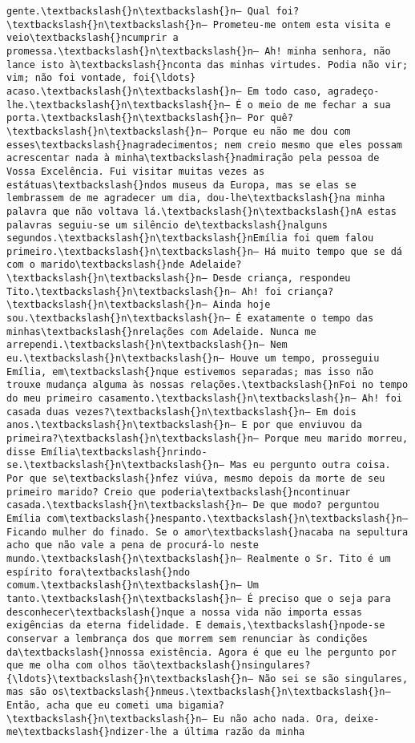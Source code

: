 \documentclass[11pt]{article}
\begin{document}
\begin{Verbatim}[commandchars=\\\{\}]
gente.\textbackslash{}n\textbackslash{}n— Qual foi?\textbackslash{}n\textbackslash{}n— Prometeu-me ontem esta visita e veio\textbackslash{}ncumprir a promessa.\textbackslash{}n\textbackslash{}n— Ah! minha senhora, não lance isto à\textbackslash{}nconta das minhas virtudes. Podia não vir; vim; não foi vontade, foi{\ldots} acaso.\textbackslash{}n\textbackslash{}n— Em todo caso, agradeço-lhe.\textbackslash{}n\textbackslash{}n— É o meio de me fechar a sua porta.\textbackslash{}n\textbackslash{}n— Por quê?\textbackslash{}n\textbackslash{}n— Porque eu não me dou com esses\textbackslash{}nagradecimentos; nem creio mesmo que eles possam acrescentar nada à minha\textbackslash{}nadmiração pela pessoa de Vossa Excelência. Fui visitar muitas vezes as estátuas\textbackslash{}ndos museus da Europa, mas se elas se lembrassem de me agradecer um dia, dou-lhe\textbackslash{}na minha palavra que não voltava lá.\textbackslash{}n\textbackslash{}nA estas palavras seguiu-se um silêncio de\textbackslash{}nalguns segundos.\textbackslash{}n\textbackslash{}nEmília foi quem falou primeiro.\textbackslash{}n\textbackslash{}n— Há muito tempo que se dá com o marido\textbackslash{}nde Adelaide?\textbackslash{}n\textbackslash{}n— Desde criança, respondeu Tito.\textbackslash{}n\textbackslash{}n— Ah! foi criança?\textbackslash{}n\textbackslash{}n— Ainda hoje sou.\textbackslash{}n\textbackslash{}n— É exatamente o tempo das minhas\textbackslash{}nrelações com Adelaide. Nunca me arrependi.\textbackslash{}n\textbackslash{}n— Nem eu.\textbackslash{}n\textbackslash{}n— Houve um tempo, prosseguiu Emília, em\textbackslash{}nque estivemos separadas; mas isso não trouxe mudança alguma às nossas relações.\textbackslash{}nFoi no tempo do meu primeiro casamento.\textbackslash{}n\textbackslash{}n— Ah! foi casada duas vezes?\textbackslash{}n\textbackslash{}n— Em dois anos.\textbackslash{}n\textbackslash{}n— E por que enviuvou da primeira?\textbackslash{}n\textbackslash{}n— Porque meu marido morreu, disse Emília\textbackslash{}nrindo-se.\textbackslash{}n\textbackslash{}n— Mas eu pergunto outra coisa. Por que se\textbackslash{}nfez viúva, mesmo depois da morte de seu primeiro marido? Creio que poderia\textbackslash{}ncontinuar casada.\textbackslash{}n\textbackslash{}n— De que modo? perguntou Emília com\textbackslash{}nespanto.\textbackslash{}n\textbackslash{}n— Ficando mulher do finado. Se o amor\textbackslash{}nacaba na sepultura acho que não vale a pena de procurá-lo neste mundo.\textbackslash{}n\textbackslash{}n— Realmente o Sr. Tito é um espírito fora\textbackslash{}ndo comum.\textbackslash{}n\textbackslash{}n— Um tanto.\textbackslash{}n\textbackslash{}n— É preciso que o seja para desconhecer\textbackslash{}nque a nossa vida não importa essas exigências da eterna fidelidade. E demais,\textbackslash{}npode-se conservar a lembrança dos que morrem sem renunciar às condições da\textbackslash{}nnossa existência. Agora é que eu lhe pergunto por que me olha com olhos tão\textbackslash{}nsingulares?{\ldots}\textbackslash{}n\textbackslash{}n— Não sei se são singulares, mas são os\textbackslash{}nmeus.\textbackslash{}n\textbackslash{}n— Então, acha que eu cometi uma bigamia?\textbackslash{}n\textbackslash{}n— Eu não acho nada. Ora, deixe-me\textbackslash{}ndizer-lhe a última razão da minha 
\end{Verbatim}
\end{document}

